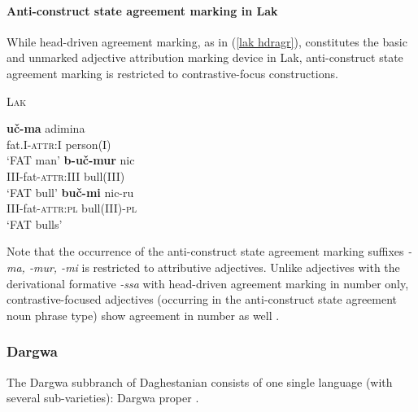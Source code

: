 \paragraph{Anti-construct state agreement marking in Lak}
While head-driven agreement marking, as in (\ref{lak hdragr}), constitutes the basic and unmarked adjective attribution marking device in Lak, anti-construct state agreement marking is restricted to contrastive-focus constructions.
\begin{exe}
\ex \textsc{Lak} \citep[45]{zirkov1955}%
\begin{xlist}
\ex
\gll	\textbf{uč-ma} adimina\\
	fat.\textsc{I}-\textsc{attr:I} person\textsc{(I)}\\
\glt	‘FAT man’
\ex
\gll	\textbf{b-uč-mur} nic\\
	\textsc{III}-fat-\textsc{attr:III} bull\textsc{(III)}\\
\glt	‘FAT bull’
\ex
\gll	\textbf{buč-mi} nic-ru\\
	\textsc{III}-fat-\textsc{attr:pl} bull\textsc{(III)}-\textsc{pl}\\
\glt	‘FAT bulls’
\end{xlist}
\end{exe}
Note that the occurrence of the anti-construct state agreement marking suffixes \textit{-ma, -mur, -mi} is restricted to attributive adjectives. Unlike adjectives with the derivational formative \textit{-ssa} with head-driven agreement marking in number only, contrastive-focused adjectives (occurring in the anti-construct state agreement noun phrase type) show agreement in number as well \citep[45–51]{zirkov1955}.

\subsubsection{Dargwa}
The Dargwa subbranch of Daghestanian consists of one single language (with several sub-varieties): Dargwa proper \cite[233]{salminen2007}.


